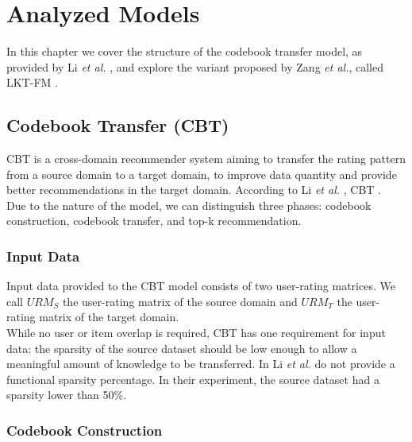 \chapter{Analyzed Models}
\label{ch:analyzed-models}

In this chapter we cover the structure of the codebook transfer model, as provided by Li \textit{et al.} \cite{10.5555/1661445.1661773}, and explore the variant proposed by Zang \textit{et al.}, called LKT-FM \cite{10.1007/978-3-319-71246-8_39}.


\section{Codebook Transfer (CBT)}

CBT is a cross-domain recommender system aiming to transfer the rating pattern from a source domain to a target domain, to improve data quantity and provide better recommendations in the target domain. According to Li \textit{et al.} \cite{10.5555/1661445.1661773}, CBT .\\
Due to the nature of the model, we can distinguish three phases: codebook construction, codebook transfer, and top-k recommendation.


\subsection{Input Data}

Input data provided to the CBT model consists of two user-rating matrices. We call $URM_S$ the user-rating matrix of the source domain and $URM_T$ the user-rating matrix of the target domain.\\
While no user or item overlap is required, CBT has one requirement for input data: the sparsity of the source dataset should be low enough to allow a meaningful amount of knowledge to be transferred. In \cite{10.5555/1661445.1661773} Li \textit{et al.} do not provide a functional sparsity percentage. In their experiment, the source dataset had a sparsity lower than 50\%.


\subsection{Codebook Construction}
\label{ss:codebook-construction}

